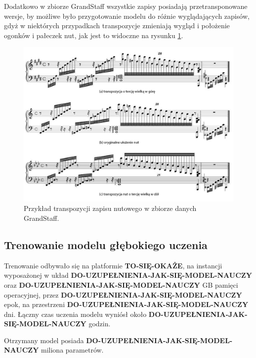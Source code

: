 Dodatkowo w zbiorze GrandStaff wszystkie zapisy posiadają przetransponowane wersje, by możliwe było przygotowanie modelu do różnie wyglądających zapisów, gdyż w niektórych przypadkach transpozycje zmieniają wygląd i położenie ogonków i pałeczek nut, jak jest to widoczne na rysunku \ref{fig:score-transposition}.

\begin{figure}
	\centering
	\includegraphics[width=14cm]{images/grandstaff-transpozycje.jpg}
	\caption{Przykład transpozycji zapisu nutowego w zbiorze danych GrandStaff.}
	\label{fig:score-transposition}
\end{figure}


\subsection{Trenowanie modelu głębokiego uczenia} \label{ModelTraining}

Trenowanie odbywało się na platformie \textbf{TO-SIĘ-OKAŻE}, na instancji wyposażonej w układ \textbf{DO-UZUPEŁNIENIA-JAK-SIĘ-MODEL-NAUCZY} oraz \textbf{DO-UZUPEŁNIENIA-JAK-SIĘ-MODEL-NAUCZY} GB pamięci operacyjnej, przez \textbf{DO-UZUPEŁNIENIA-JAK-SIĘ-MODEL-NAUCZY} epok, na przestrzeni \textbf{DO-UZUPEŁNIENIA-JAK-SIĘ-MODEL-NAUCZY} dni. Łączny czas uczenia modelu wyniósł około \textbf{DO-UZUPEŁNIENIA-JAK-SIĘ-MODEL-NAUCZY} godzin.

Otrzymany model posiada \textbf{DO-UZUPEŁNIENIA-JAK-SIĘ-MODEL-NAUCZY} miliona parametrów.

